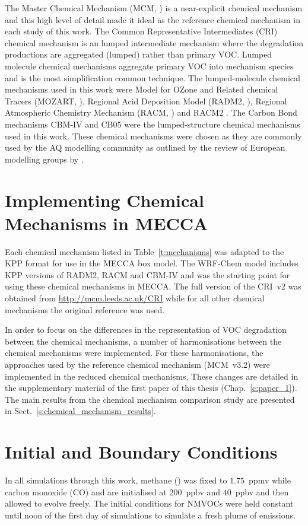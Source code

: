 The Master Chemical Mechanism (MCM, \citet{Jenkin:1997, Jenkin:2003, Saunders:2003, Bloss:2005, MCM_Site}) is a near-explicit chemical mechanism and this high level of detail made it ideal as the reference chemical mechanism in each study of this work.
The Common Representative Intermediates (CRI) chemical mechanism \citep{Jenkin:2008} is an lumped intermediate mechanism where the degradation productions are aggregated (lumped) rather than primary VOC.
Lumped molecule chemical mechanisms aggregate primary VOC into mechanism species and is the most simplification common technique.
The lumped-molecule chemical mechanisms used in this work were Model for OZone and Related chemical Tracers (MOZART, \citet{Emmons:2010}), Regional Acid Deposition Model (RADM2, \citet{Stockwell:1990}), Regional Atmospheric Chemistry Mechanism (RACM, \citet{Stockwell:1997}) and RACM2 \citet{Goliff:2013}.
The Carbon Bond mechanisms CBM-IV \citep{Gery:1989} and CB05 \citep{Yarwood:2005} were the lumped-structure chemical mechanisms used in this work.
These chemical mechanisms were chosen as they are commonly used by the AQ modelling community as outlined by the review of European modelling groups by \citet{Baklanov:2014}.


\section{Implementing Chemical Mechanisms in MECCA} \label{s:mechanisms_MECCA}
Each chemical mechanism listed in Table~\ref{t:mechanisms} was adapted to the KPP format for use in the MECCA box model.
The WRF-Chem model \citep{Grell:2005} includes KPP versions of RADM2, RACM and CBM-IV and was the starting point for using these chemical mechanisms in MECCA.
The full version of the CRI~v2 was obtained from \mbox{\url{http://mcm.leeds.ac.uk/CRI}} while for all other chemical mechanisms the original reference was used.

In order to focus on the differences in the representation of VOC degradation between the chemical mechanisms, a number of harmonisations between the chemical mechanisms were implemented.
For these harmonisations, the approaches used by the reference chemical mechanism (MCM~v3.2) were implemented in the reduced chemical mechanisms,
These changes are detailed in the supplementary material of the first paper of this thesis (Chap.~\ref{c:paper_1}). 
The main results from the chemical mechanism comparison study are presented in Sect.~\ref{s:chemical_mechanism_results}.

\section{Initial and Boundary Conditions} \label{s:initial_conditions}
In all simulations through this work, methane () was fixed to $1.75$~ppmv while carbon monoxide (CO) and  are initialised at $200$~ppbv and $40$~ppbv and then allowed to evolve freely.
The initial conditions for NMVOCs were held constant until noon of the first day of simulations to simulate a fresh plume of emissions.

